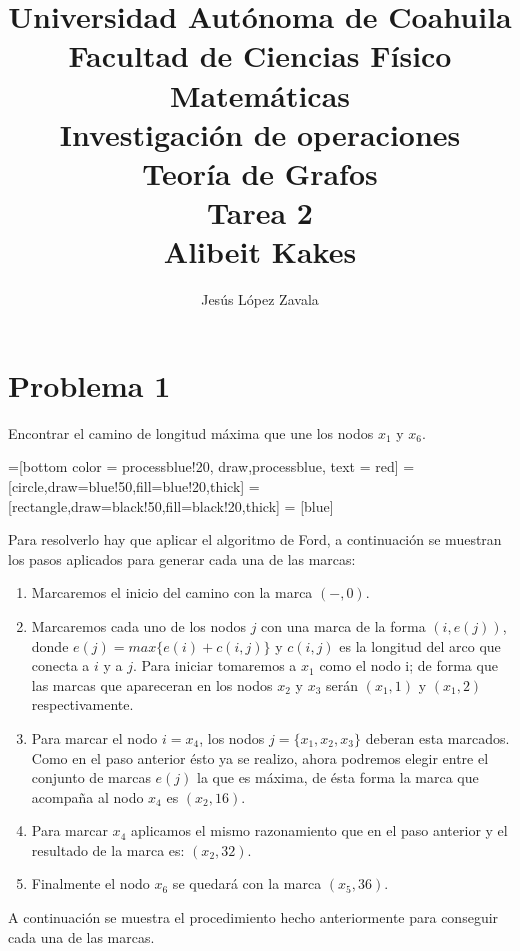 \documentclass[autocontact]{gaceta}
\title{Universidad Autónoma de Coahuila \\ Facultad de Ciencias Físico Matemáticas
\\ Investigación de operaciones \\ Teoría de Grafos \\ Tarea 2 \\ Alibeit Kakes}
\author{Jesús López Zavala} %
\begin{document}
\maketitle


\section{Problema 1}
    Encontrar el camino de longitud máxima que une los nodos $x_{1}$ y $x_{6}$.
    
    =[bottom color = processblue!20, draw,processblue, text = red]
    =[circle,draw=blue!50,fill=blue!20,thick]
    =[rectangle,draw=black!50,fill=black!20,thick]
    = [blue]
    
    

    Para resolverlo hay que aplicar el algoritmo de Ford, a continuación se muestran los pasos 
    aplicados para generar cada una de las marcas:
    \begin{enumerate}
        \item Marcaremos el inicio del camino con la marca $(-,0).$
        \item Marcaremos cada uno de los nodos $j$  con una marca de la forma $(i, e(j))$, donde 
        $ e(j) = max \{e(i) + c(i,j)\}$ y $c(i, j)$ es la longitud del arco que conecta a $i$ y a $j$.
            Para iniciar tomaremos a $x_1$ como el nodo i; de forma que 
            las marcas que apareceran en los nodos $x_2$ y $x_3$ serán $(x_1, 1)$ y $(x_1, 2)$ 
            respectivamente.
        \item Para marcar el nodo $i = x_4$, los nodos $j = \{ x_1, x_2, x_3\}$ deberan esta marcados.
            Como en el paso anterior ésto ya se realizo, ahora podremos elegir entre el conjunto de marcas
            $e(j)$ la que es máxima, de ésta forma la marca que acompaña al nodo $x_4$ es $(x_2, 16)$.
        \item Para marcar $x_4$ aplicamos el mismo razonamiento que en el paso anterior y el resultado
        de la marca es: $(x_2, 32)$.
        \item Finalmente el nodo $x_6$ se quedará con la marca $(x_5, 36)$.
    \end{enumerate}
    A continuación se muestra el procedimiento hecho anteriormente para conseguir cada una de las 
    marcas. 
    
\end{document}
